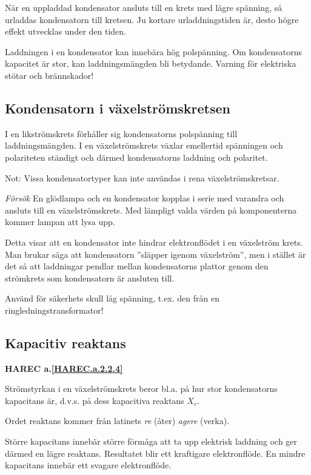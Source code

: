 När en uppladdad kondensator ansluts till en krets med lägre spänning, så
urladdas kondensatorn till kretsen. Ju kortare urladdningstiden är, desto högre
effekt utvecklas under den tiden.

Laddningen i en kondensator kan innebära hög polspänning. Om kondensatorns
kapacitet är stor, kan laddningsmängden bli betydande. Varning för elektriska
stötar och brännskador!

\subsection{Kondensatorn i växelströmskretsen}

I en likströmskrets förhåller sig kondensatorns polspänning till
laddningsmängden. I en växelströmskrets växlar emellertid spänningen och
polariteten ständigt och därmed kondensatorns laddning och polaritet.

Not: Vissa kondensatortyper kan inte användas i rena växelströmskretsar.

\emph{Försök}
En glödlampa och en kondensator kopplas i serie med varandra och ansluts till en
växelströmskrets. Med lämpligt valda värden på komponenterna kommer lampan att
lysa upp.

Detta visar att en kondensator inte hindrar elektronflödet i en växelström
krets. Man brukar säga att kondensatorn ''släpper igenom växelström'', men i
stället är det så att laddningar pendlar mellan kondensatorns plattor genom den
strömkrets som kondensatorn är ansluten till.

Använd för säkerhets skull låg spänning, t.ex. den från en
ringledningstransformator!

\subsection{Kapacitiv reaktans}
\textbf{HAREC a.\ref{HAREC.a.2.2.4}\label{myHAREC.a.2.2.4}}

Strömstyrkan i en växelströmskrets beror bl.a. på hur stor kondensatorns
kapacitans är, d.v.s. på dess kapacitiva reaktans \(X_c\).

Ordet reaktans kommer från latinets \emph{re} (åter) \emph{agere} (verka).

Större kapacitans innebär större förmåga att ta upp elektrisk laddning och ger
därmed en lägre reaktans. Resultatet blir ett kraftigare elektronflöde.
En mindre kapacitans innebär ett svagare elektronflöde.

